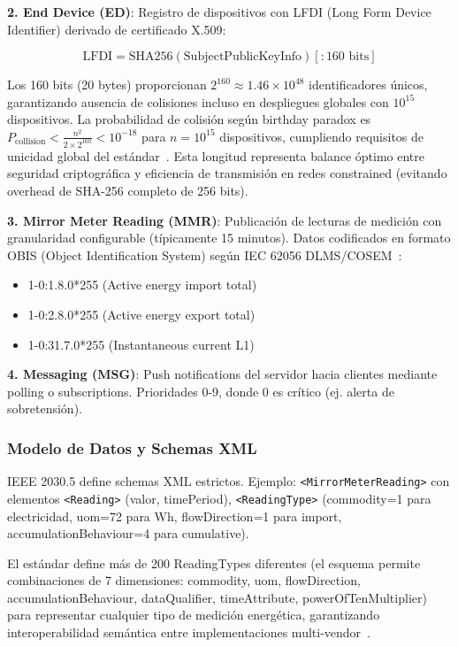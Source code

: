 \textbf{2. End Device (ED)}: Registro de dispositivos con LFDI (Long Form Device Identifier) derivado de certificado X.509:

\begin{equation}
\text{LFDI} = \text{SHA256}(\text{SubjectPublicKeyInfo})[:160 \text{ bits}]
\end{equation}

Los 160 bits (20 bytes) proporcionan $2^{160} \approx 1.46 \times 10^{48}$ identificadores únicos, garantizando ausencia de colisiones incluso en despliegues globales con $10^{15}$ dispositivos. La probabilidad de colisión según birthday paradox es $P_{\text{collision}} < \frac{n^2}{2 \times 2^{160}} < 10^{-18}$ para $n=10^{15}$ dispositivos, cumpliendo requisitos de unicidad global del estándar~\cite{IEEERecommendedPractice}. Esta longitud representa balance óptimo entre seguridad criptográfica y eficiencia de transmisión en redes constrained (evitando overhead de SHA-256 completo de 256 bits).

\textbf{3. Mirror Meter Reading (MMR)}: Publicación de lecturas de medición con granularidad configurable (típicamente 15 minutos). Datos codificados en formato OBIS (Object Identification System) según IEC 62056 DLMS/COSEM~\cite{IEC62056-2021}:

\begin{itemize}
\item 1-0:1.8.0*255 (Active energy import total)
\item 1-0:2.8.0*255 (Active energy export total)
\item 1-0:31.7.0*255 (Instantaneous current L1)
\end{itemize}

\textbf{4. Messaging (MSG)}: Push notifications del servidor hacia clientes mediante polling o subscriptions. Prioridades 0-9, donde 0 es crítico (ej. alerta de sobretensión).

\subsubsection{Modelo de Datos y Schemas XML}

IEEE 2030.5 define schemas XML estrictos. Ejemplo: \texttt{<MirrorMeterReading>} con elementos \texttt{<Reading>} (valor, timePeriod), \texttt{<ReadingType>} (commodity=1 para electricidad, uom=72 para Wh, flowDirection=1 para import, accumulationBehaviour=4 para cumulative).

El estándar define más de 200 ReadingTypes diferentes (el esquema permite combinaciones de 7 dimensiones: commodity, uom, flowDirection, accumulationBehaviour, dataQualifier, timeAttribute, powerOfTenMultiplier) para representar cualquier tipo de medición energética, garantizando interoperabilidad semántica entre implementaciones multi-vendor~\cite{IEEERecommendedPractice}.

